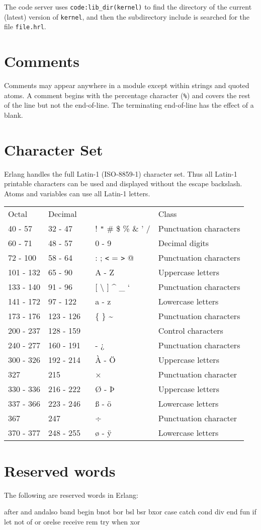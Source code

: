 The code server uses \texttt{code:lib\_dir(kernel)} to find the
directory of the current (latest) version of \texttt{kernel}, and then
the subdirectory include is searched for the file \texttt{file.hrl}.


\section{Comments}
Comments may appear anywhere in a module except within strings and
quoted atoms.  A comment begins with the percentage character
(\texttt{\%}) and covers the rest of the line but not the
end-of-line. The terminating end-of-line has the effect of a blank.


\section{Character Set}
Erlang handles the full Latin-1 (ISO-8859-1) character set. Thus all
Latin-1 printable characters can be used and displayed without the
escape backslash. Atoms and variables can use all Latin-1 letters.

\begin{center}
\begin{tabular}{|>{\raggedright}p{52pt}|>{\raggedright}p{53pt}|>{\raggedright}p{103pt}|>{\raggedright}p{87pt}|}
\hline
\multicolumn{4}{|p{297pt}|}{Character classes}\tabularnewline
\hline
Octal & Decimal~ &   & Class\tabularnewline
\hline
40 -  57 & 32 - 47 &  ! \texttt{"} \# \$ \% \& ' / & Punctuation
characters\tabularnewline
\hline
60 -  71 & 48 - 57 & 0 - 9 & Decimal digits\tabularnewline
\hline
72 - 100 & 58 - 64 & : ; \texttt{<} = \texttt{>} @ & Punctuation characters\tabularnewline
\hline
101 - 132 &  65 - 90 & A - Z & Uppercase letters\tabularnewline
\hline
133 - 140 &  91 - 96 & [ \textbackslash{} ] \textasciicircum{} \_ ` & Punctuation
characters\tabularnewline
\hline
141 - 172 &  97 - 122 & a  -  z & Lowercase letters\tabularnewline
\hline
173 - 176 & 123 - 126 & \{ \textbar{} \} \textasciitilde{} & Punctuation characters\tabularnewline
\hline
200 - 237 & 128 - 159 ~ &   & Control characters \tabularnewline
\hline
240 - 277 & 160 - 191 & - ¿  & Punctuation characters \tabularnewline
\hline
300 - 326 & 192 - 214 & À - Ö  & Uppercase letters \tabularnewline
\hline
327  & 215 & ×  & Punctuation character \tabularnewline
\hline
330 - 336 & 216 - 222 & Ø - Þ  & Uppercase letters \tabularnewline
\hline
337 - 366 & 223 - 246 & ß - ö  & Lowercase letters \tabularnewline
\hline
367  & 247 & ÷  & Punctuation character \tabularnewline
\hline
370 - 377 & 248 - 255 & ø - ÿ  & Lowercase letters \tabularnewline
\hline
\end{tabular}
\end{center}

\section{Reserved words}

\vspace{12pt}

The following are reserved words in Erlang:

\begin{erlang}
after and andalso band begin bnot bor bsl bsr bxor case catch cond
div end fun if let not of or orelse receive rem try when xor
\end{erlang}
